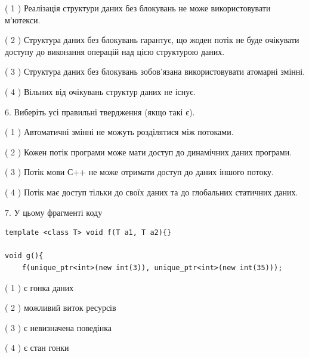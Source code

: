\documentclass[12pt, ukrainian]{article}
\begin{document}
\begin {large}
{( 1 ) Реалізація структури даних без блокувань не може використовувати м’ютекси.%

( 2 ) Структура даних без блокувань гарантує, що жоден потік не буде очікувати доступу до виконання операцій над цією структурою даних.%

( 3 ) Структура даних без блокувань зобов’язана використовувати атомарні змінні.%

( 4 ) Вільних від очікувань структур даних не існує.%
\newpage



\vspace{5mm}
6. Виберіть усі правильні твердження (якщо такі є).\par
\vspace{2mm}

( 1 ) Автоматичні змінні не можуть розділятися між потоками.%

( 2 ) Кожен потік програми може мати доступ до динамічних даних програми.%

( 3 ) Потік мови С++ не може отримати доступ до даних іншого потоку.%

( 4 ) Потік має доступ тільки до своїх даних та до глобальних статичних даних.%


\vspace{5mm}
7. У цьому фрагменті коду
\begin{verbatim}
template <class T> void f(T a1, T a2){}

void g(){
    f(unique_ptr<int>(new int(3)), unique_ptr<int>(new int(35)));
\end{verbatim}

( 1 ) є гонка даних%

( 2 ) можливий виток ресурсів%

( 3 ) є невизначена поведінка%

( 4 ) є стан гонки%
}
\end {large}
\end{document}
